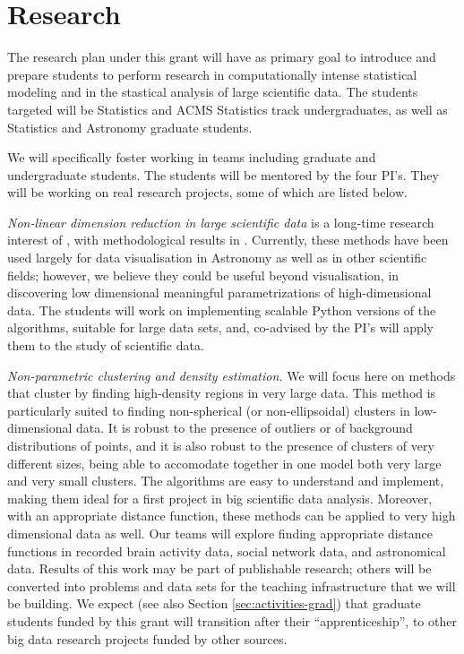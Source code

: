 \section{Research}
\label{sec:research}

The research plan under this grant will have as primary goal to
introduce and prepare students to perform research in computationally
intense statistical modeling and in the stastical analysis of large
scientific data. The students targeted will be Statistics and ACMS
Statistics track undergraduates, as well as Statistics and Astronomy
graduate students. 

We will specifically foster working in teams including graduate and
undergraduate students. The students will be mentored by the four
PI's. They will be working on real research projects, some of which
are listed below. 
\bits
\item {\em Non-linear dimension reduction in large scientific data} is a long-time research interest of \meila, with methodological results in \cite{x}. Currently, these methods have been used largely for data visualisation in Astronomy as well as in other scientific fields; however, we believe they could be useful beyond visualisation, in discovering low dimensional meaningful parametrizations of high-dimensional data. The students will work on implementing scalable Python versions of the algorithms, suitable for large data sets, and, co-advised by the PI's will apply them to the study of scientific data.
\item {\em Non-parametric clustering and density estimation.} We will
  focus here on methods that cluster by finding high-density regions
  in very large data. This method is particularly suited to finding
  non-spherical (or non-ellipsoidal) clusters in low-dimensional
  data. It is robust to the presence of outliers or of background
  distributions of points, and it is also robust to the presence of
  clusters of very different sizes, being able to accomodate together
  in one model both very large and very small clusters. The algorithms
  are easy to understand and implement, making them ideal for a first
  project in big scientific data analysis. Moreover, with an
  appropriate distance function, these methods can be applied to very
  high dimensional data as well. Our teams will explore finding
  appropriate distance functions in recorded brain activity data,
  social network data, and astronomical data.  
\eits
%
Results of this work may be part of publishable research; others will
be converted into problems and data sets for the teaching
infrastructure that we will be building. We expect (see also Section
\ref{sec:activities-grad}) that graduate students funded by this grant
will transition after their ``apprenticeship'', to other big data
research projects funded by other sources. 
